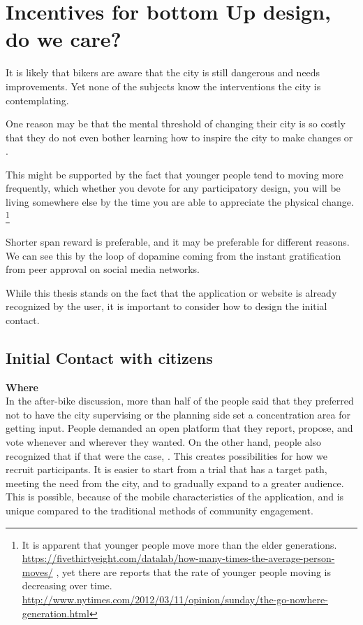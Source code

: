 \section{Incentives for bottom Up design, do we care?}
\label{sec:incent}

It is likely that bikers are aware that the city is still dangerous and needs improvements. Yet none of the subjects know the interventions the city is contemplating.

One reason may be that the mental threshold of changing their city is so costly that they do not even bother learning how to inspire the city to make changes or .

This might be supported by the fact that younger people tend to moving more frequently, which whether you devote for any participatory design, you will be living somewhere else by the time you are able to appreciate the physical change.
\footnote{It is apparent that younger people move more than the elder generations. 
\url{https://fivethirtyeight.com/datalab/how-many-times-the-average-person-moves/}
, yet there are reports that the rate of younger people moving is decreasing over time.\\
\url{http://www.nytimes.com/2012/03/11/opinion/sunday/the-go-nowhere-generation.html}
}

Shorter span reward is preferable, and it may be preferable for different reasons. We can see this by the
loop of dopamine coming from the instant gratification from peer approval on social media networks.

While this thesis stands on the fact that the application or website is already recognized by the user,
it is important to consider how to design the initial contact.

\subsection{Initial Contact with citizens}

\textbf{Where} \\ 
In the after-bike discussion, more than half of the people said that they preferred not to have the city supervising or the planning side set a concentration area for getting input. People demanded an open platform that they report, propose, and vote whenever and wherever they wanted. On the other hand, people also recognized that if that were the case, . This creates possibilities for how we recruit participants. It is easier to start from a trial that has a target path, meeting the need from the city, and to gradually expand to a greater audience. This is possible, because of the mobile characteristics of the application, and is unique compared to the traditional methods of community engagement.


